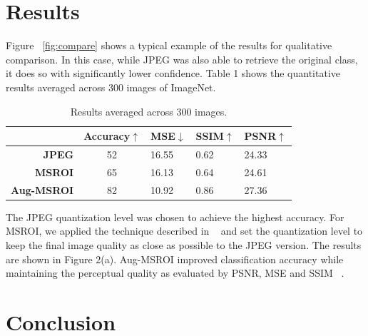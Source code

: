 \section{Results}
Figure ~\ref{fig:compare} shows a typical example of the results for qualitative comparison. In this case, while JPEG was also able to retrieve the original class, it does so with significantly lower confidence. 
Table 1 shows the quantitative results averaged across 300 images of ImageNet.

\begin{table}[H]
\centering
\label{tbl:results}
\begin{tabular}{rclll}
\multicolumn{1}{l}{} & \textbf{Accuracy$\uparrow$} & \textbf{MSE$\downarrow$} & \textbf{SSIM$\uparrow$} & \textbf{PSNR$\uparrow$} \\ \hline
\textbf{JPEG}        & 52                & 16.55        & 0.62          & 24.33         \\
\textbf{MSROI}       & 65                & 16.13        & 0.64          & 24.61         \\
\textbf{Aug-MSROI}   & 82                & 10.92        & 0.86          & 27.36        
\end{tabular}
\caption[Quantitative results using Aug-MSROI]{Results averaged across $300$ images. }
\end{table}
 

The JPEG quantization level was chosen to achieve the highest accuracy. 
For MSROI, we applied the technique described in ~\cite{Prakash2017SemanticPI} and set the quantization level to keep the final image quality as close as possible to the JPEG version. The results are shown in Figure 2(a). %
Aug-MSROI improved classification accuracy while maintaining the perceptual quality as evaluated by PSNR, MSE and SSIM ~\cite{wang2004image}. %

\section{Conclusion}

